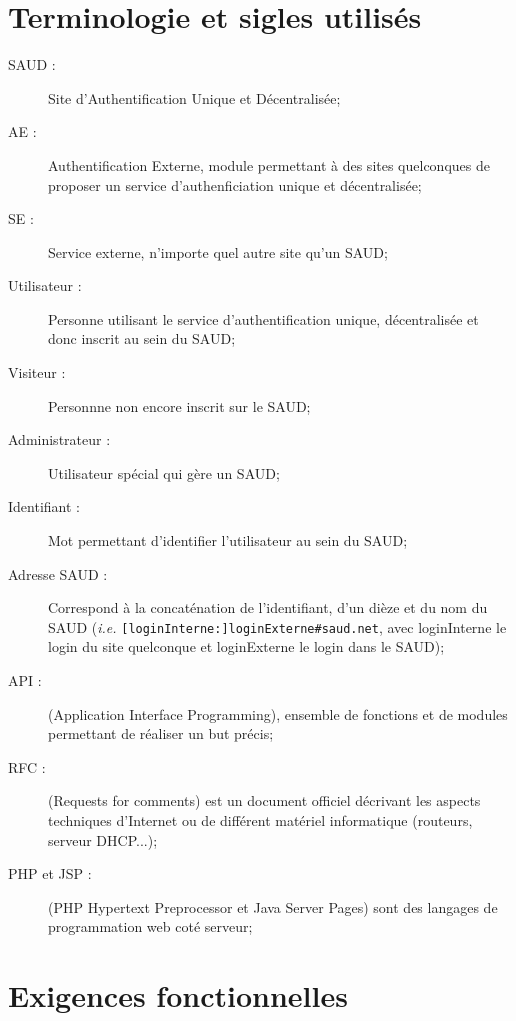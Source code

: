 \documentclass[a4paper,11pt,french]{article}
\begin{document}
\section{Terminologie et sigles utilisés}
\begin{description}
	\item[SAUD :] Site d'Authentification Unique et Décentralisée;
	\item[AE :] Authentification Externe, module permettant à des sites quelconques de proposer un
    service d'authenficiation unique et décentralisée;
	\item[SE :] Service externe, n'importe quel autre site qu'un SAUD;
	\item[Utilisateur :] Personne utilisant le service d'authentification unique, décentralisée 
	et donc inscrit au sein du SAUD;
	\item[Visiteur :] Personnne non encore inscrit sur le SAUD;
	\item[Administrateur :] Utilisateur spécial qui gère un SAUD;
	\item[Identifiant :] Mot permettant d'identifier l'utilisateur au sein du SAUD;
	\item[Adresse SAUD :] 	Correspond à la concaténation de l'identifiant, d'un dièze et du nom du SAUD
	(\emph{i.e.} \verb+[loginInterne:]loginExterne#saud.net+, avec
loginInterne le login du site quelconque
et loginExterne le login dans le SAUD);
	\item[API :] (Application Interface Programming), ensemble de fonctions
et de modules permettant de réaliser un but précis;
	\item[RFC :] (Requests for comments) est un document officiel décrivant les aspects techniques d'Internet
	ou de différent matériel informatique (routeurs, serveur DHCP...);
	\item[PHP et JSP :] (PHP Hypertext Preprocessor et Java Server Pages) sont des langages de programmation web coté serveur;
\end{description}


\section{Exigences fonctionnelles}
\end{document}
